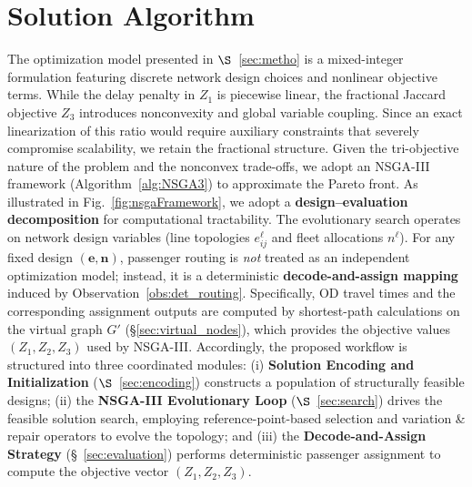 \documentclass[a4paper,fleqn]{cas-sc}
\begin{document}
\section{Solution Algorithm}\label{sec:alg}
The optimization model presented in $\S$~\ref{sec:metho} is a mixed-integer formulation featuring discrete network design choices and nonlinear objective terms.
While the delay penalty in $Z_1$ is piecewise linear, the fractional Jaccard objective $Z_3$ introduces nonconvexity and global variable coupling.
Since an exact linearization of this ratio would require auxiliary constraints that severely compromise scalability, we retain the fractional structure.
%
Given the tri-objective nature of the problem and the nonconvex trade-offs, we adopt an NSGA-III framework (Algorithm~\ref{alg:NSGA3}) to approximate the Pareto front.
%
As illustrated in Fig.~\ref{fig:nsgaFramework}, we adopt a \textbf{design--evaluation decomposition} for computational tractability.
The evolutionary search operates on network design variables (line topologies $e_{ij}^\ell$ and fleet allocations $n^\ell$).
For any fixed design $(\mathbf e,\mathbf n)$, passenger routing is \emph{not} treated as an independent optimization model; instead, it is a deterministic \textbf{decode-and-assign mapping} induced by Observation~\ref{obs:det_routing}.
Specifically, OD travel times and the corresponding assignment outputs are computed by shortest-path calculations on the virtual graph $G'$ (\S\ref{sec:virtual_nodes}), which provides the objective values $(Z_1,Z_2,Z_3)$ used by NSGA-III.
%
Accordingly, the proposed workflow is structured into three coordinated modules:
(i) \textbf{Solution Encoding and Initialization} ($\S$~\ref{sec:encoding}) constructs a population of structurally feasible designs;
(ii) the \textbf{NSGA-III Evolutionary Loop} ($\S$~\ref{sec:search}) drives the feasible solution search, employing reference-point-based selection and variation \& repair operators to evolve the topology; and
(iii) the \textbf{Decode-and-Assign Strategy} (\S~\ref{sec:evaluation}) performs deterministic passenger assignment to compute the objective vector $(Z_1, Z_2, Z_3)$.
\end{document}
